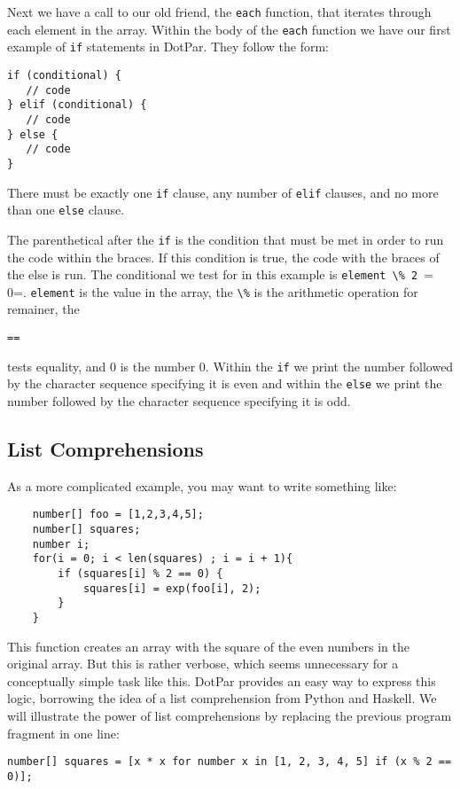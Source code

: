 Next we have a call to our old friend, the \verb=each= function, that iterates
through each element in the array. Within the body of the \verb=each= function
we have our first example of \verb=if= statements in DotPar. They follow the
form: 

\begin{verbatim}
if (conditional) {
   // code
} elif (conditional) {
   // code
} else {
   // code
}
\end{verbatim}

There must be exactly one \verb=if= clause, any number of \verb=elif= clauses,
and no more than one \verb=else= clause.

The parenthetical after the \verb=if= is the condition that must be met in order
to run the code within the braces. If this condition is true, the code with the
braces of the else is run. The conditional we test for in this example is
\verb=element \% 2 == 0=. \verb=element= is the value in the array, the
\verb=\%= is the arithmetic operation for remainer, the \begin{verbatim}== 
\end{verbatim} tests equality, and 0 is the number 0. Within the \verb=if= we
print the number followed by the character sequence specifying it is even and
within the \verb=else= we print the number followed by the character sequence
specifying it is odd.

\subsection{List Comprehensions}
As a more complicated example, you may want to write something like:

\begin{verbatim}
    number[] foo = [1,2,3,4,5];
    number[] squares;
    number i;
    for(i = 0; i < len(squares) ; i = i + 1){
        if (squares[i] % 2 == 0) {
            squares[i] = exp(foo[i], 2);
        }
    }
\end{verbatim}

This function creates an array with the square of the even numbers in the
original array. But this is rather verbose, which seems unnecessary for a
conceptually simple task like this. DotPar provides an easy way to express this
logic, borrowing the idea of a list comprehension from Python and Haskell. We
will illustrate the power of list comprehensions by replacing the previous
program fragment in one line:

\begin{verbatim}
number[] squares = [x * x for number x in [1, 2, 3, 4, 5] if (x % 2 == 0)];
\end{verbatim}

